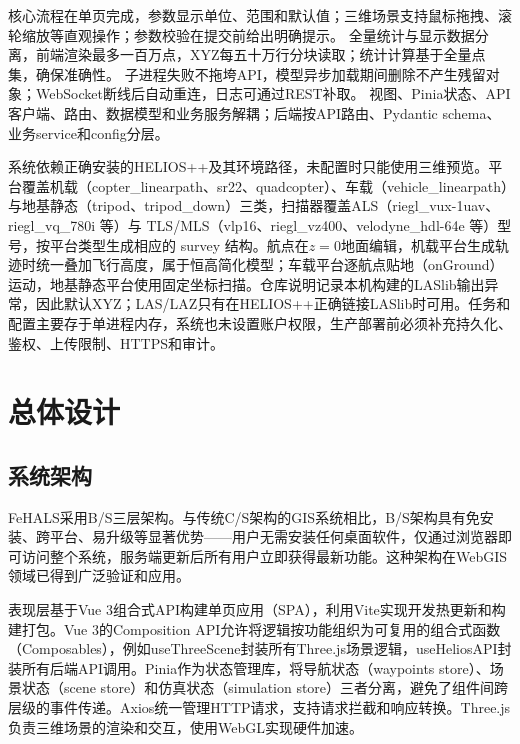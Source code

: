 \documentclass[a4paper,fleqn]{cas-sc}
\begin{document}
\begin{description}
     核心流程在单页完成，参数显示单位、范围和默认值；三维场景支持鼠标拖拽、滚轮缩放等直观操作；参数校验在提交前给出明确提示。
     全量统计与显示数据分离，前端渲染最多一百万点，XYZ每五十万行分块读取；统计计算基于全量点集，确保准确性。
     子进程失败不拖垮API，模型异步加载期间删除不产生残留对象；WebSocket断线后自动重连，日志可通过REST补取。
     视图、Pinia状态、API客户端、路由、数据模型和业务服务解耦；后端按API路由、Pydantic schema、业务service和config分层。
\end{description}

系统依赖正确安装的HELIOS++及其环境路径，未配置时只能使用三维预览。平台覆盖机载（copter\_linearpath、sr22、quadcopter）、车载（vehicle\_linearpath）与地基静态（tripod、tripod\_down）三类，扫描器覆盖ALS（riegl\_vux-1uav、riegl\_vq\_780i 等）与 TLS/MLS（vlp16、riegl\_vz400、velodyne\_hdl-64e 等）型号，按平台类型生成相应的 survey 结构。航点在$z=0$地面编辑，机载平台生成轨迹时统一叠加飞行高度，属于恒高简化模型；车载平台逐航点贴地（onGround）运动，地基静态平台使用固定坐标扫描。仓库说明记录本机构建的LASlib输出异常，因此默认XYZ；LAS/LAZ只有在HELIOS++正确链接LASlib时可用。任务和配置主要存于单进程内存，系统也未设置账户权限，生产部署前必须补充持久化、鉴权、上传限制、HTTPS和审计。

\section{总体设计}

\subsection{系统架构}

FeHALS采用B/S三层架构。与传统C/S架构的GIS系统相比，B/S架构具有免安装、跨平台、易升级等显著优势——用户无需安装任何桌面软件，仅通过浏览器即可访问整个系统，服务端更新后所有用户立即获得最新功能。这种架构在WebGIS领域已得到广泛验证和应用\citep{viswebdrone,lidarWebgis,pointCloudWeb}。

表现层基于Vue 3组合式API构建单页应用（SPA），利用Vite实现开发热更新和构建打包\citep{vite}。Vue 3的Composition API允许将逻辑按功能组织为可复用的组合式函数（Composables），例如useThreeScene封装所有Three.js场景逻辑，useHeliosAPI封装所有后端API调用。Pinia作为状态管理库\citep{pinia}，将导航状态（waypoints store）、场景状态（scene store）和仿真状态（simulation store）三者分离，避免了组件间跨层级的事件传递。Axios统一管理HTTP请求，支持请求拦截和响应转换。Three.js负责三维场景的渲染和交互，使用WebGL实现硬件加速\citep{threejs,webgl}。
\end{document}
